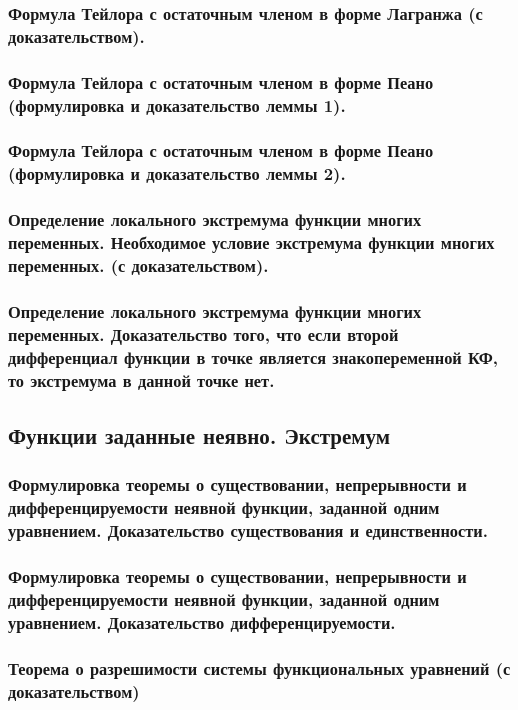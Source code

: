 \documentclass[10pt]{article}
\begin{document}
    \subsubsection{Формула Тейлора с остаточным членом в форме Лагранжа (с доказательством).}
    \subsubsection{Формула Тейлора с остаточным членом в форме Пеано (формулировка и доказательство леммы 1).}
    \subsubsection{Формула Тейлора с остаточным членом в форме Пеано (формулировка и доказательство леммы 2).}
    \subsubsection{Определение локального экстремума функции многих переменных. Необходимое условие экстремума функции многих переменных. (с доказательством).}
    \subsubsection{Определение локального экстремума функции многих переменных. Доказательство того, что если второй дифференциал функции в точке является знакопеременной КФ, то экстремума в данной точке нет.}
    \subsection{Функции заданные неявно. Экстремум}
    \subsubsection{Формулировка теоремы о существовании, непрерывности и дифференцируемости неявной функции, заданной одним уравнением. Доказательство существования и единственности.}
    \subsubsection{Формулировка теоремы о существовании, непрерывности и дифференцируемости неявной функции, заданной одним уравнением. Доказательство дифференцируемости.}
    \subsubsection{Теорема о разрешимости системы функциональных уравнений (с доказательством)}
\end{document}
